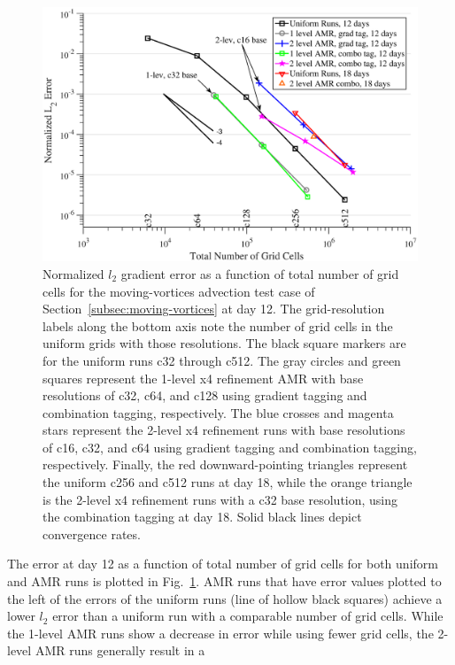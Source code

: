 \begin{figure}
    \centerline{%
    \noindent
    \includegraphics[width=\textwidth]{Chap1/sprladv_errvsgrid.eps}}
    \caption{Normalized $l_2$ gradient error as a function of total
    number of grid cells for the moving-vortices advection test case of
Section~\ref{subsec:moving-vortices}
 at day 12.
    The grid-resolution labels along the bottom axis note the number of
    grid cells in the uniform grids with those resolutions.  The black
    square markers are for the uniform runs c32 through c512.  The gray
    circles and green squares represent the 1-level x4 refinement AMR
    with base resolutions of c32, c64, and c128 using gradient tagging
    and combination tagging, respectively.  The blue crosses and magenta
    stars represent the 2-level x4 refinement runs with base
    resolutions of c16, c32, and c64 using gradient tagging and
    combination tagging, respectively.  Finally, the red downward-pointing
    triangles represent the uniform c256 and c512 runs at day 18, while
    the orange triangle is the 2-level x4 refinement runs with a c32
    base resolution, using the combination tagging at day 18.  Solid
    black lines depict convergence rates.}%
    \label{fig:spradvl2vgrid}
\end{figure}
%
The error at day 12 as a function of total number of grid cells for both
uniform and AMR runs is plotted in
Fig.~\ref{fig:spradvl2vgrid}.  AMR runs that have error values plotted to the
left of the errors of the uniform runs (line of hollow black squares)
achieve a lower $l_2$ error than a uniform run with a comparable
number of grid cells.  While the 1-level AMR runs show a decrease in
error while using fewer grid cells, the 2-level AMR runs generally result in a
